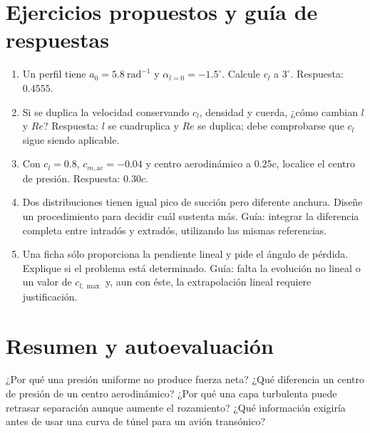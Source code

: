 \section{Ejercicios propuestos y guía de respuestas}
\begin{enumerate}
\item Un perfil tiene $a_0=5.8\ \mathrm{rad^{-1}}$ y $\alpha_{l=0}=-1.5^\circ$. Calcule $c_l$ a $3^\circ$. Respuesta: $0.4555$.
\item Si se duplica la velocidad conservando $c_l$, densidad y cuerda, ¿cómo cambian $l$ y $Re$? Respuesta: $l$ se cuadruplica y $Re$ se duplica; debe comprobarse que $c_l$ sigue siendo aplicable.
\item Con $c_l=0.8$, $c_{m,\mathrm{ac}}=-0.04$ y centro aerodinámico a $0.25c$, localice el centro de presión. Respuesta: $0.30c$.
\item Dos distribuciones tienen igual pico de succión pero diferente anchura. Diseñe un procedimiento para decidir cuál sustenta más. Guía: integrar la diferencia completa entre intradós y extradós, utilizando las mismas referencias.
\item Una ficha sólo proporciona la pendiente lineal y pide el ángulo de pérdida. Explique si el problema está determinado. Guía: falta la evolución no lineal o un valor de $c_{l,\max}$ y, aun con éste, la extrapolación lineal requiere justificación.
\end{enumerate}
\section{Resumen y autoevaluación}
¿Por qué una presión uniforme no produce fuerza neta? ¿Qué diferencia un centro de presión de un centro aerodinámico? ¿Por qué una capa turbulenta puede retrasar separación aunque aumente el rozamiento? ¿Qué información exigiría antes de usar una curva de túnel para un avión transónico?


\studiumchaptercheck
